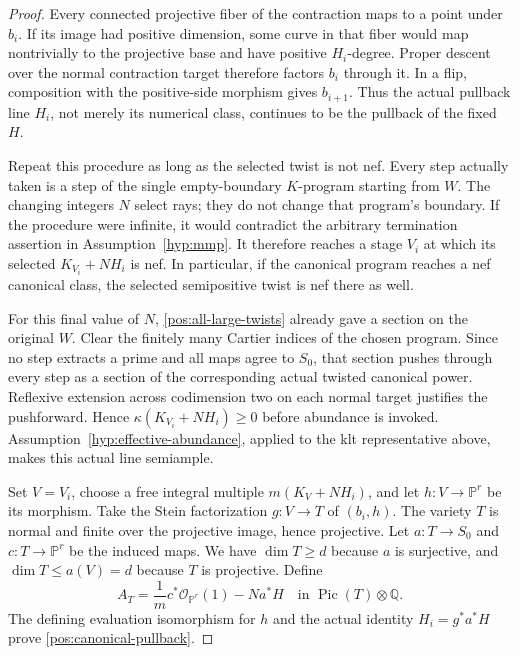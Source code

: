 \documentclass[11pt,letterpaper]{article}
\theoremstyle{definition}
\theoremstyle{remark}
\begin{document}
\begin{proof}
Every connected projective fiber of the contraction maps to a point
under \(b_i\). If its image had positive dimension, some curve in that
fiber would map nontrivially to the projective base and have positive
\(H_i\)-degree. Proper descent over the normal contraction target
therefore factors \(b_i\) through it. In a flip, composition with the
positive-side morphism gives \(b_{i+1}\). Thus the actual pullback line
\(H_i\), not merely its numerical class, continues to be the pullback
of the fixed \(H\).

Repeat this procedure as long as the selected twist is not nef.
Every step actually taken is a step of the single empty-boundary
\(K\)-program starting from \(W\). The changing integers \(N\)
select rays; they do not change that program's boundary. If the
procedure were infinite, it would contradict the arbitrary termination
assertion in Assumption~\ref{hyp:mmp}. It therefore reaches a stage
\(V_i\) at which its selected \(K_{V_i}+NH_i\) is nef. In particular,
if the canonical program reaches a nef canonical class, the selected
semipositive twist is nef there as well.

For this final value of \(N\), \eqref{pos:all-large-twists} already
gave a section on the original \(W\). Clear the finitely many Cartier
indices of the chosen program. Since no step extracts a prime and all
maps agree to \(S_0\), that section pushes through every step as a
section of the corresponding actual twisted canonical power.
Reflexive extension across codimension two on each normal target
justifies the pushforward. Hence
\(\kappa(K_{V_i}+NH_i)\geq0\) before abundance is invoked.
Assumption~\ref{hyp:effective-abundance}, applied to the klt
representative above, makes this actual line semiample.

Set \(V=V_i\), choose a free integral multiple
\(m(K_V+NH_i)\), and let \(h:V\to\mathbb{P}^r\) be its morphism.
Take the Stein factorization \(g:V\to T\) of \((b_i,h)\).
The variety \(T\) is normal and finite over the projective image,
hence projective. Let \(a:T\to S_0\) and \(c:T\to\mathbb{P}^r\) be the
induced maps. We have \(\dim T\geq d\) because \(a\) is surjective,
and \(\dim T\leq a(V)=d\) because \(T\) is projective. Define
\begin{equation}\label{pos:actual-base-line}
 A_T=\frac1m c^*\mathcal{O}_{\mathbb{P}^r}(1)-N a^*H
 \quad\text{in }\operatorname{Pic}(T)\otimes\mathbb{Q}.
\end{equation}
The defining evaluation isomorphism for \(h\) and the actual identity
\(H_i=g^*a^*H\) prove \eqref{pos:canonical-pullback}.
\end{proof}
\end{document}
